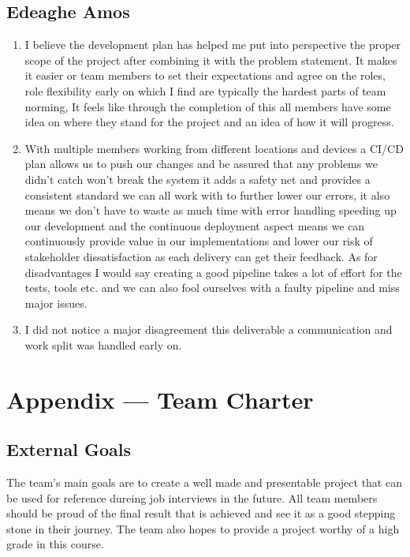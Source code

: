 \documentclass{article}
\begin{document}
\subsection*{Edeaghe Amos}

\begin{enumerate}
  \item I believe the development plan has helped me put into perspective the proper scope of the project after combining it with the problem statement. It makes it easier or team members to set their expectations and agree on the roles, role flexibility early on which I find are typically the hardest parts of team norming, It feels like through the completion of this all members have some idea on where they stand for the project and an idea of how it will progress. 
  \item With multiple members working from different locations and devices a CI/CD plan allows us to push our changes and be assured that any problems we didn't catch won't break the system it adds a safety net and provides a consistent standard we can all work with to further lower our errors, it also means we don't have to waste as much time with error handling speeding up our development and the continuous deployment aspect means we can continuously provide value in our implementations and lower our risk of stakeholder dissatisfaction as each delivery can get their feedback. 
  As for disadvantages I would say creating a good pipeline takes a lot of effort for the tests, tools etc. and we can also fool ourselves with a faulty pipeline and miss major issues. 
  \item I did not notice a major disagreement this deliverable a communication and work split was handled early on.
\end{enumerate}

\newpage{}

\section*{Appendix --- Team Charter}

\subsection*{External Goals}

The team's main goals are to create a well made and presentable project that can be used for reference dureing job interviews in the future.
All team members should be proud of the final result that is achieved and see it as a good stepping stone in their journey.
The team also hopes to provide a project worthy of a high grade in this course.
\end{document}
